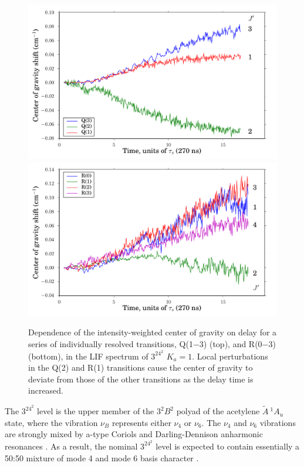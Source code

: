 \documentclass[12pt]{mitthesis}
\newcommand{\astate}{$
  \tilde{A} \: ^1\!A_u
  $}
\newcommand{\Ka}[1]{$K_a\!\!=\!#1$}
\begin{document}
\begin{figure}
  \caption{Dependence of the intensity-weighted center of gravity on
    delay for a series of individually resolved transitions, Q(1$-$3)
    (top), and R(0$-$3) (bottom), in the LIF spectrum of $3^24^2$
    \Ka{1}.  Local perturbations in the Q(2) and R(1) transitions
    cause the center of gravity to deviate from those of the other
    transitions as the delay time is increased.}
  \label{fig:32b2-cog-delay}
  \centering
  \vspace{5mm}
  \includegraphics[width=6in]{32b2-q123-cog-delay.pdf}
  \includegraphics[width=6in]{32b2-r0123-cog-delay.pdf}
\end{figure}



The $3^24^2$ level is the upper member of the $3^2B^2$ polyad of the
acetylene \astate state, where the vibration $\nu_B$ represents either
$\nu_4$ or $\nu_6$.  The $\nu_4$ and $\nu_6$ vibrations are strongly
mixed by a-type Coriols and Darling-Dennison anharmonic resonances
\cite{merer08}.  As a result, the nominal $3^24^2$ level is expected
to contain essentially a 50:50 mixture of mode 4 and mode 6 basis
character \cite{merer08, virgo07}.
\end{document}

